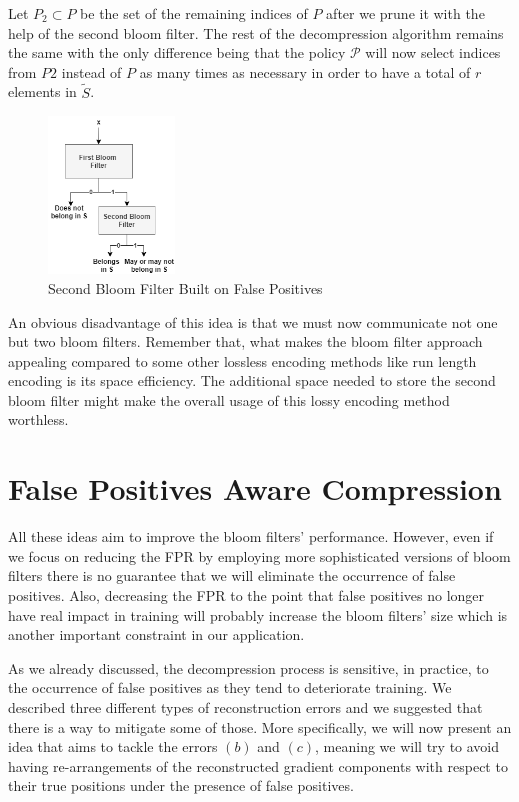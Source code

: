         Let $P_2 \subset P$ be the set of the remaining indices of $P$ after we prune it with the help of the second bloom filter.
        The rest of the decompression algorithm remains the same with the only difference being that the policy $\mathcal{P}$ will now select indices from $P2$ instead of $P$ as many times as necessary in order to have a total of $r$ elements in $\tilde{S}$.
        
        \begin{figure}[h]
        \centering
        \includegraphics[width=0.3\textwidth]{thesis/figures/second-bloom.png}
        \caption{Second Bloom Filter Built on False Positives}
        \end{figure}

        An obvious disadvantage of this idea is that we must now communicate not one but two bloom filters.
        Remember that, what makes the bloom filter approach appealing compared to some other lossless encoding methods like run length encoding is its space efficiency.
        The additional space needed to store the second bloom filter might make the overall usage of this lossy encoding method worthless.

    \section{False Positives Aware Compression}
        All these ideas aim to improve the bloom filters' performance.
        However, even if we focus on reducing the FPR by employing more sophisticated versions of bloom filters there is no guarantee that we will eliminate the occurrence of false positives. 
        Also, decreasing the FPR to the point that false positives no longer have real impact in training will probably increase the bloom filters' size which is another important constraint in our application.
        
        As we already discussed, the decompression process is  sensitive, in practice, to the occurrence of false positives as they tend to deteriorate training.
        We described three different types of reconstruction errors and we suggested that there is a way to mitigate some of those.
        More specifically, we will now present an idea that aims to tackle the errors $(b)$ and $(c)$, meaning we will try to avoid having re-arrangements of the reconstructed gradient components with respect to their true positions under the presence of false positives.
        
